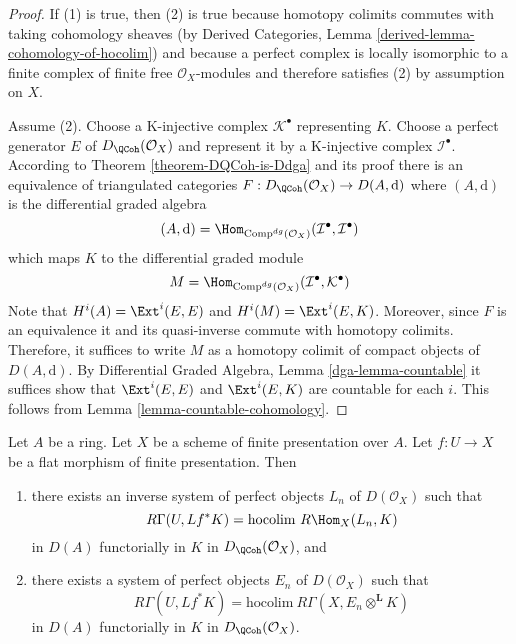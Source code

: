 \begin{proof}
If (1) is true, then (2) is true because homotopy colimits commutes
with taking cohomology sheaves
(by Derived Categories, Lemma \ref{derived-lemma-cohomology-of-hocolim})
and because a perfect complex is
locally isomorphic to a finite complex of finite free $\mathcal{O}_X$-modules
and therefore satisfies (2) by assumption on $X$.

\medskip\noindent
Assume (2).
Choose a K-injective complex $\mathcal{K}^\bullet$ representing $K$.
Choose a perfect generator $E$ of $D_\QCoh(\mathcal{O}_X)$ and
represent it by a K-injective complex $\mathcal{I}^\bullet$.
According to Theorem \ref{theorem-DQCoh-is-Ddga}
and its proof there is an equivalence
of triangulated categories $F : D_\QCoh(\mathcal{O}_X) \to D(A, \text{d})$
where $(A, \text{d})$ is the differential graded algebra
$$
(A, \text{d}) =
\Hom_{\text{Comp}^{dg}(\mathcal{O}_X)}
(\mathcal{I}^\bullet, \mathcal{I}^\bullet)
$$
which maps $K$ to the differential graded module
$$
M = \Hom_{\text{Comp}^{dg}(\mathcal{O}_X)}
(\mathcal{I}^\bullet, \mathcal{K}^\bullet)
$$
Note that $H^i(A) = \Ext^i(E, E)$ and
$H^i(M) = \Ext^i(E, K)$.
Moreover, since $F$ is an equivalence it and its quasi-inverse commute
with homotopy colimits.
Therefore, it suffices to write $M$ as a homotopy colimit
of compact objects of $D(A, \text{d})$.
By Differential Graded Algebra, Lemma \ref{dga-lemma-countable}
it suffices show that $\Ext^i(E, E)$ and
$\Ext^i(E, K)$ are countable for each $i$.
This follows from Lemma \ref{lemma-countable-cohomology}.
\end{proof}

\begin{lemma}
\label{lemma-computing-sections-as-colim}
Let $A$ be a ring. Let $X$ be a scheme of finite presentation over $A$.
Let $f : U \to X$ be a flat morphism of finite presentation. Then
\begin{enumerate}
\item there exists an inverse system of perfect objects $L_n$ of
$D(\mathcal{O}_X)$ such that
$$
R\Gamma(U, Lf^*K) = \text{hocolim}\ R\Hom_X(L_n, K)
$$
in $D(A)$ functorially in $K$ in $D_\QCoh(\mathcal{O}_X)$, and
\item there exists a system of perfect objects $E_n$ of
$D(\mathcal{O}_X)$ such that
$$
R\Gamma(U, Lf^*K) = \text{hocolim}\ R\Gamma(X, E_n \otimes^\mathbf{L} K)
$$
in $D(A)$ functorially in $K$ in $D_\QCoh(\mathcal{O}_X)$.
\end{enumerate}
\end{lemma}

